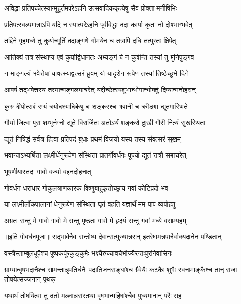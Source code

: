 \twolineshloka
{अविद्धा प्रतिपच्चेत्स्यान्मुहूर्तमपरेऽहनि}
{उत्सवादिककृत्येषु सैव प्रोक्ता मनीषिभिः} %

\twolineshloka
{प्रतिपत्स्वल्पमात्राऽपि यदि न स्यात्परेऽहनि}
{पूर्वविद्धा तदा कार्या कृता नो दोषभाग्भवेत्} %

\twolineshloka
{तद्दिने गृहमध्ये तु कुर्यान्मूर्तिं तदाङ्गणे}
{गोमयेन च तत्रापि दधि तत्पुरतः क्षिपेत्} %

\twolineshloka
{आर्तिक्यं तत्र संस्थाप्य एवं कुर्याद्विधानतः}
{अभ्यङ्गं ये न कुर्वन्ति तस्यां तु मुनिपुङ्गव} %

\twolineshloka
{न माङ्गल्यं भवेत्तेषां यावत्स्याद्वत्सरं ध्रुवम्}
{यो यादृशेन रूपेण तस्यां तिष्ठेच्छुभे दिने} %

\twolineshloka
{आवर्षं तद्भवेत्तस्य तस्मान्मङ्गलमाचरेत्}
{यदीच्छेत्स्वशुभान्भोगान्भोक्तुं दिव्यान्मनोहरान्} %

\twolineshloka
{कुरु दीपोत्सवं रम्यं त्रयोदश्यादिकेषु च}
{शङ्करश्च भवानी च क्रीडया द्यूतमास्थिते} %

\twolineshloka
{गौर्या जित्वा पुरा शम्भुर्नग्नो द्यूते विसर्जितः}
{अतोऽर्थं शङ्करो दुःखी गौरी नित्यं सुखस्थिता} %

\twolineshloka
{द्यूतं निषिद्धं सर्वत्र हित्वा प्रतिपदं बुधाः}
{प्रथमं विजयो यस्य तस्य संवत्सरं सुखम्} %

\twolineshloka
{भवान्याऽभ्यर्थिता लक्ष्मीर्धेनुरूपेण संस्थिता}
{प्रातर्गोवर्धनः पूज्यो द्यूतं रात्रौ समाचरेत्} %


\onelineshloka
{भूषणीयास्तदा गावो वर्ज्या वहनदोहनात्} %

\twolineshloka
{गोवर्धन धराधार गोकुलत्राणकारक}
{विष्णुबाहुकृतोच्छ्राय गवां कोटिप्रदो भव} %

\twolineshloka
{या लक्ष्मीर्लोकपालानां धेनुरूपेण संस्थिता}
{घृतं वहति यज्ञार्थे मम पापं व्यपोहतु} %

\twolineshloka
{अग्रतः सन्तु मे गावो गावो मे सन्तु पृष्ठतः}
{गावो मे हृदयं सन्तु गवां मध्ये वसाम्यहम्} %


॥इति गोवर्धनपूजा॥
\twolineshloka
{सद्भावेनैव सन्तोष्य देवान्सत्पुरुषान्नरान्}
{इतरेषामन्नपानैर्वाक्यदानेन पण्डितान्} %

\twolineshloka
{वस्त्रैस्ताम्बूलधूपैश्च पुष्पकर्पूरकुङ्कुमैः}
{भक्ष्यैरुच्चावचैर्भोज्यैरन्तःपुरनिवासिनः} %

\threelineshloka
{ग्राम्यान्वृषभदानैश्च सामन्तान्नृपतिर्धनैः}
{पदातिजनसङ्घांश्च ग्रैवेयैः कटकैः शुभैः}
{स्वनामाङ्कैश्च तान् राजा तोषयेत्सज्जनान् पृथक्} %

\twolineshloka
{यथार्थं तोषयित्वा तु ततो मल्लान्नरांस्तथा}
{वृषभान्महिषांश्चैव युध्यमानान् परैः सह} %

